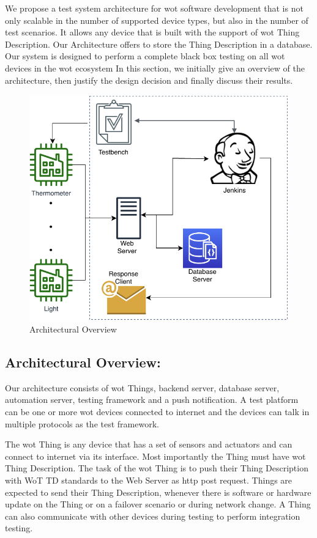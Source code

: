 \documentclass[conference]{IEEEtran}
\theoremstyle{definition}
\begin{document}
We propose a test system architecture for \ac{wot} software development that is not only scalable in the number of supported device types, but also in the number of test scenarios. 
It allows any device that is built with the support of \ac{wot} Thing Description. 
Our Architecture offers to store the Thing Description in a database. 
Our system is designed to perform a complete black box testing on all \ac{wot} devices in the \ac{wot} ecosystem
In this section, we initially give an overview of the architecture, then justify the design decision and finally discuss their results.

\begin{figure}[t]
  \centerline{\includegraphics[scale=0.6]{arch} }
  
  \caption{Architectural Overview}
  \label{fig:Architecture}
\end{figure}

\subsection{Architectural Overview: }
Our architecture consists of \ac{wot} Things, backend server, database server, automation server, testing framework and a push notification. 
A test platform can be one or more \ac{wot} devices connected to internet and the devices can talk in multiple protocols as the test framework. 

The \ac{wot} Thing is any device that has a set of sensors and actuators and can connect to internet via its interface. 
Most importantly the Thing must have \ac{wot} Thing Description. 
The task of the \ac{wot} Thing is to push their Thing Description with WoT TD standards to the Web  Server as http post request. 
Things are expected to send their Thing Description, whenever there is software or hardware update on the Thing or on a failover scenario or during network change. 
A Thing can also communicate with other devices during testing to perform integration testing.
\end{document}
